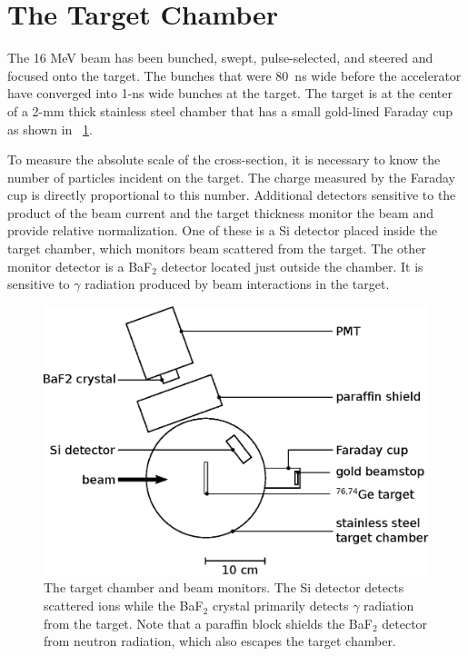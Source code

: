 \section{The Target Chamber}
\label{sec:beamMonitors}

The 16 MeV  beam has been bunched, swept, pulse-selected, and steered and focused onto the target.  The bunches that were 80~ns wide before the accelerator have converged into 1-ns wide bunches at the target.  The target is at the center of a 2-mm thick stainless steel chamber that has a small gold-lined Faraday cup as shown in {\fig}~\ref{fig:targetChamber}.

To measure the absolute scale of the cross-section, it is necessary to know the number of particles incident on the target.  The charge measured by the Faraday cup is directly proportional to this number.  Additional detectors sensitive to the product of the beam current and the target thickness monitor the beam and provide relative normalization.  One of these is a Si detector placed inside the target chamber, which monitors  beam scattered from the target.  The other monitor detector is a BaF$_2$ detector located just outside the chamber.  It is sensitive to $\gamma$ radiation produced by beam interactions in the target.  
\begin{figure}[htp]
\centering
\includegraphics[width=1.0\textwidth]{figures/targetChamber.eps}
\caption[The target chamber and beam monitors.]{The target chamber and beam monitors.  The Si detector detects scattered  ions while the BaF$_2$ crystal primarily detects $\gamma$ radiation from the target.  Note that a paraffin block shields the BaF$_2$ detector from neutron radiation, which also escapes the target chamber.}
\label{fig:targetChamber}
\end{figure}


